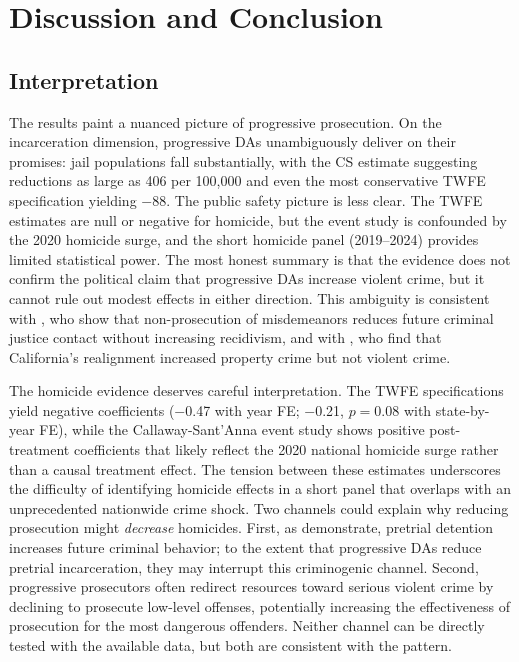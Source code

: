 \documentclass[12pt]{article}
\begin{document}
\section{Discussion and Conclusion}

\subsection{Interpretation}

The results paint a nuanced picture of progressive prosecution. On the incarceration dimension, progressive DAs unambiguously deliver on their promises: jail populations fall substantially, with the CS estimate suggesting reductions as large as 406 per 100,000 and even the most conservative TWFE specification yielding $-$88. The public safety picture is less clear. The TWFE estimates are null or negative for homicide, but the event study is confounded by the 2020 homicide surge, and the short homicide panel (2019--2024) provides limited statistical power. The most honest summary is that the evidence does not confirm the political claim that progressive DAs increase violent crime, but it cannot rule out modest effects in either direction. This ambiguity is consistent with \citet{agan2023misdemeanor}, who show that non-prosecution of misdemeanors reduces future criminal justice contact without increasing recidivism, and with \citet{lofstrom2022incapacitation}, who find that California's realignment increased property crime but not violent crime.

The homicide evidence deserves careful interpretation. The TWFE specifications yield negative coefficients ($-$0.47 with year FE; $-$0.21, $p = 0.08$ with state-by-year FE), while the Callaway-Sant'Anna event study shows positive post-treatment coefficients that likely reflect the 2020 national homicide surge rather than a causal treatment effect. The tension between these estimates underscores the difficulty of identifying homicide effects in a short panel that overlaps with an unprecedented nationwide crime shock. Two channels could explain why reducing prosecution might \textit{decrease} homicides. First, as \citet{dobbie2018effects} demonstrate, pretrial detention increases future criminal behavior; to the extent that progressive DAs reduce pretrial incarceration, they may interrupt this criminogenic channel. Second, progressive prosecutors often redirect resources toward serious violent crime by declining to prosecute low-level offenses, potentially increasing the effectiveness of prosecution for the most dangerous offenders. Neither channel can be directly tested with the available data, but both are consistent with the pattern.
\end{document}
